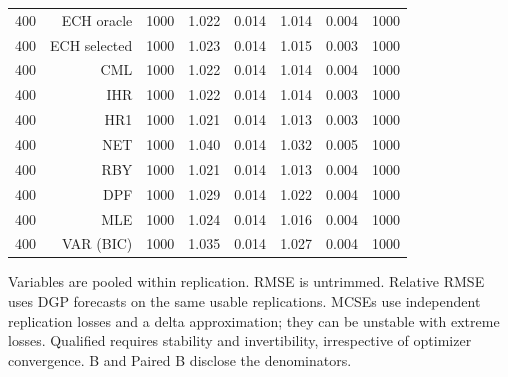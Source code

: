\begin{table}[p]
\begin{tabular}{rrrrrrrr}
400 & ECH oracle & 1000 & 1.022 & 0.014 & 1.014 & 0.004 & 1000 \\
400 & ECH selected & 1000 & 1.023 & 0.014 & 1.015 & 0.003 & 1000 \\
400 & CML & 1000 & 1.022 & 0.014 & 1.014 & 0.004 & 1000 \\
400 & IHR & 1000 & 1.022 & 0.014 & 1.014 & 0.003 & 1000 \\
400 & HR1 & 1000 & 1.021 & 0.014 & 1.013 & 0.003 & 1000 \\
400 & NET & 1000 & 1.040 & 0.014 & 1.032 & 0.005 & 1000 \\
400 & RBY & 1000 & 1.021 & 0.014 & 1.013 & 0.004 & 1000 \\
400 & DPF & 1000 & 1.029 & 0.014 & 1.022 & 0.004 & 1000 \\
400 & MLE & 1000 & 1.024 & 0.014 & 1.016 & 0.004 & 1000 \\
400 & VAR (BIC) & 1000 & 1.035 & 0.014 & 1.027 & 0.004 & 1000 \\
\bottomrule\end{tabular}
\par\medskip
\begin{minipage}{0.98\linewidth}\footnotesize Variables are pooled within replication. RMSE is untrimmed. Relative RMSE uses DGP forecasts on the same usable replications. MCSEs use independent replication losses and a delta approximation; they can be unstable with extreme losses. Qualified requires stability and invertibility, irrespective of optimizer convergence. B and Paired B disclose the denominators.\end{minipage}
\end{table}
